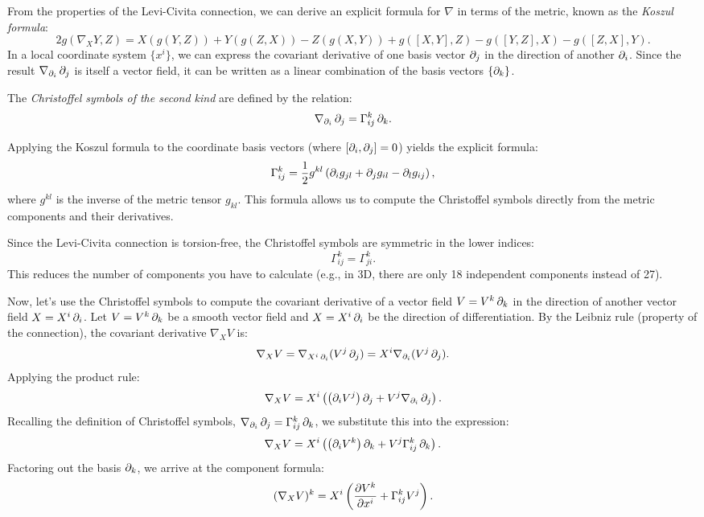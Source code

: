 From the properties of the Levi-Civita connection, we can derive an explicit formula for $\nabla$ in terms of the metric, known as the \emph{Koszul formula}:
\[%
  2 g(\nabla_X Y, Z) = X(g(Y,Z)) + Y(g(Z,X)) - Z(g(X,Y)) + g([X,Y], Z) - g([Y,Z], X) - g([Z,X], Y)
.\]%
In a local coordinate system $\{x^i\}$, we can express the covariant derivative of one basis vector $\pd{j}$ in the direction of another $\pd{i}$. Since the result $\nabla_{\pd{i}} \pd{j}$ is itself a vector field, it can be written as a linear combination of the basis vectors $\{\pd{k}\}$.

\begin{definition}
  The \emph{Christoffel symbols of the second kind} are defined by the relation:
  \[%
    \nabla_{\pd{i}} \pd{j} = \Gamma^k_{ij} \pd{k}
  .\]%

  Applying the Koszul formula to the coordinate basis vectors (where $[\pd{i}, \pd{j}] = 0$) yields the explicit formula:
  \[%
    \Gamma^k_{ij} = \frac{1}{2} g^{kl} \left( \pd{i} g_{jl} + \pd{j} g_{il} - \pd{l} g_{ij} \right)
  ,\]%
  where $g^{kl}$ is the inverse of the metric tensor $g_{kl}$. This formula allows us to compute the Christoffel symbols directly from the metric components and their derivatives.
\end{definition}

Since the Levi-Civita connection is torsion-free, the Christoffel symbols are symmetric in the lower indices:
\[%
  \Gamma^k_{ij} = \Gamma^k_{ji}
.\]%
This reduces the number of components you have to calculate (e.g., in 3D, there are only 18 independent components instead of 27).

Now, let's use the Christoffel symbols to compute the covariant derivative of a vector field $V = V^k \pd{k}$ in the direction of another vector field $X = X^i \pd{i}$. Let $V = V^k\pd{k}$ be a smooth vector field and $X = X^i\pd{i}$ be the direction of differentiation. By the Leibniz rule (property of the connection), the covariant derivative $\nabla_X V$ is:
\[%
  \nabla_XV = \nabla_{X^i\pd{i}}(V^j\pd{j}) = X^i\nabla_{\pd{i}}(V^j\pd{j})
.\]%
Applying the product rule:
\[%
  \nabla_XV = X^i\left(\left(\pd{i}V^j\right)\pd{j} + V^j\nabla_{\pd{i}}\pd{j}\right)
.\]%
Recalling the definition of Christoffel symbols, $\nabla_{\pd{i}}\pd{j} = \Gamma_{ij}^k \pd{k}$, we substitute this into the expression:
\[%
  \nabla_XV = X^i\left(\left(\pd{i}V^k\right)\pd{k} + V^j\Gamma_{ij}^k \pd{k}\right)
.\]%
Factoring out the basis $\pd{k}$, we arrive at the component formula:
\[%
  (\nabla_X V)^k = X^i \left(\pdv{V^k}{x^i} + \Gamma^k_{ij} V^j\right)
.\]%

